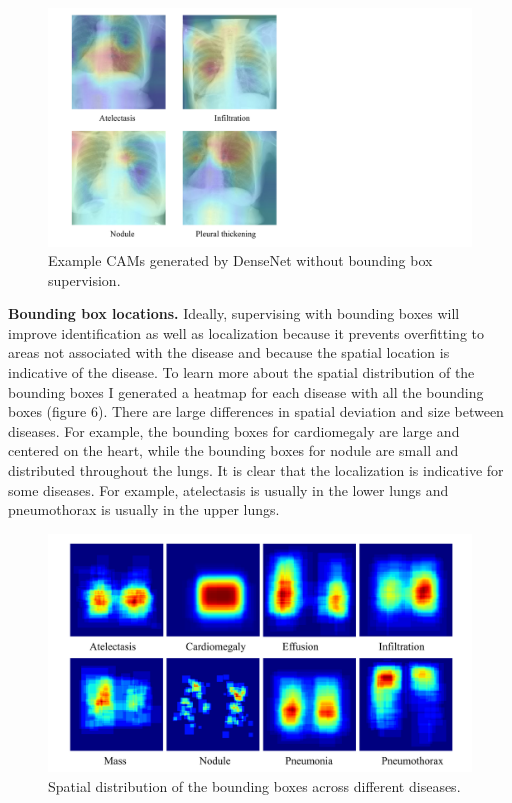 \documentclass{article}
\begin{document}
\begin{figure}[p]
\vskip 0.2in
\begin{center}
\centerline{\includegraphics[width=\columnwidth]{figure_5}}
\caption{Example CAMs generated by DenseNet without bounding box supervision.}
\label{figure 5:}
\end{center}
\vskip -0.2in
\end{figure}

{\bf Bounding box locations.} Ideally, supervising with bounding boxes will improve identification as well as localization because it prevents overfitting to areas not associated with the disease and because the spatial location is indicative of the disease. To learn more about the spatial distribution of the bounding boxes I generated a heatmap for each disease with all the bounding boxes (figure 6). There are large differences in spatial deviation and size between diseases. For example, the bounding boxes for cardiomegaly are large and centered on the heart, while the bounding boxes for nodule are small and distributed throughout the lungs. It is clear that the localization is indicative for some diseases. For example, atelectasis is usually in the lower lungs and pneumothorax is usually in the upper lungs.

\begin{figure}[p]
\vskip 0.2in
\begin{center}
\centerline{\includegraphics[width=\columnwidth]{figure_6}}
\caption{Spatial distribution of the bounding boxes across different diseases.}
\label{figure 6:}
\end{center}
\vskip -0.2in
\end{figure}
\end{document}
